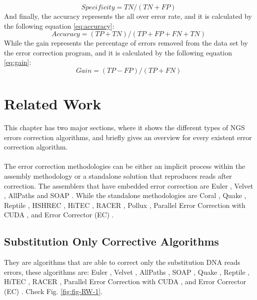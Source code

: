 \documentclass[12pt,openany]{llncs}
\begin{document}
\begin{equation} \label{eq:specificity}
  Specificity = TN/(TN+FP) 
\end{equation}
And finally, the accuracy represents the all over error rate, and it is calculated by the following equation \ref{eq:accuracy}:
\begin{equation} \label{eq:accuracy}
  Accuracy = (TP+TN)/(TP+FP+FN+TN)
\end{equation} 
While the gain represents the percentage of errors removed from the data set by the error correction program, and it is calculated by the following equation \ref{eq:gain}:
\begin{equation} \label{eq:gain}
  Gain = (TP-FP)/(TP+FN)
\end{equation} 



\newpage
\chapter{\label{chap:3}Related Work}
This chapter has two major sections, where it shows the different types of NGS errors correction algorithms, and briefly gives an overview for every existent error correction algorithm.
\\
\\
The error correction methodologies can be either an implicit process within the assembly methodology or a standalone solution that reproduces reads after correction. The assemblers that have embedded error correction are Euler \cite{Euler}, Velvet \cite{Velvet}, AllPaths \cite{AllPaths} and SOAP \cite{Soap}. While the standalone methodologies are Coral \cite{Coral}, Quake \cite{Quake}, Reptile \cite{Reptile}, HSHREC \cite{HShrec}, HiTEC \cite{HiTec}, RACER \cite{Racer}, Pollux \cite{Pollux}, Parallel Error Correction with CUDA \cite{Cuda}, and Error Corrector (EC) \cite{EC}.
\section{Substitution Only Corrective Algorithms}
They are algorithms that are able to correct only the substitution DNA reads errors, these algorithms are: Euler \cite{Euler}, Velvet \cite{Velvet}, AllPaths \cite{AllPaths}, SOAP \cite{Soap}, Quake \cite{Quake}, Reptile \cite{Reptile}, HiTEC \cite{HiTec}, RACER \cite{Racer}, Parallel Error Correction with CUDA \cite{Cuda}, and Error Corrector (EC) \cite{EC}. Check Fig. \ref{fig:fig-RW-1}.
\end{document}
